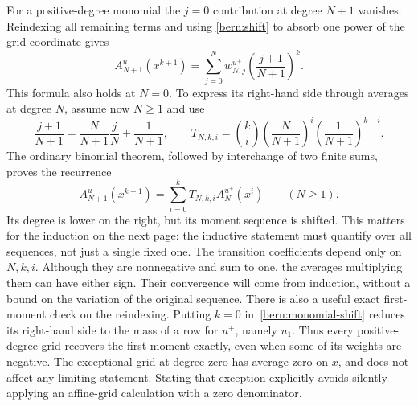 For a positive-degree monomial the $j=0$ contribution at degree
$N+1$ vanishes. Reindexing all remaining terms and using
\eqref{bern:shift} to absorb one power of the grid coordinate gives
\begin{equation}\label{bern:monomial-shift}
 A_{N+1}^u(x^{k+1})=
 \sum_{j=0}^Nw^{u^+}_{N,j}
       \left(\frac{j+1}{N+1}\right)^k.
\end{equation}
This formula also holds at $N=0$. To express its right-hand side
through averages at degree $N$, assume now $N\ge1$ and use
\[
 \frac{j+1}{N+1}=\frac{N}{N+1}\frac jN+\frac1{N+1},
 \qquad
 T_{N,k,i}=\binom ki\left(\frac N{N+1}\right)^i
                    \left(\frac1{N+1}\right)^{k-i}.
\]
The ordinary binomial theorem, followed by interchange of two finite
sums, proves the recurrence
\begin{equation}\label{bern:recurrence}
 A_{N+1}^u(x^{k+1})=
       \sum_{i=0}^kT_{N,k,i}A_N^{u^+}(x^i)
       \qquad(N\ge1).
\end{equation}
Its degree is lower on the right, but its moment sequence is shifted.
This matters for the induction on the next page: the inductive
statement must quantify over all sequences, not just a single fixed
one. The transition coefficients depend only on $N,k,i$. Although
they are nonnegative and sum to one, the averages multiplying them
can have either sign. Their convergence will come from induction,
without a bound on the variation of the original sequence.
There is also a useful exact first-moment check on the reindexing.
Putting $k=0$ in~\eqref{bern:monomial-shift} reduces its right-hand
side to the mass of a row for $u^+$, namely $u_1$. Thus every
positive-degree grid recovers the first moment exactly, even when
some of its weights are negative. The exceptional grid at degree
zero has average zero on $x$, and does not affect any limiting
statement. Stating that exception explicitly avoids silently applying
an affine-grid calculation with a zero denominator.

\label{bern:convergence-page}

